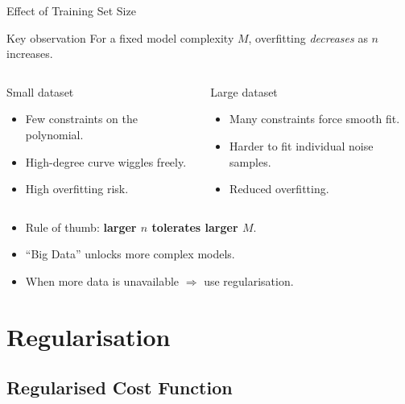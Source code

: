 \begin{frame}{Effect of Training Set Size}
  \begin{block}{Key observation}
    For a fixed model complexity $M$, overfitting \emph{decreases} as $n$ increases.
  \end{block}
  \begin{columns}[T]
  \begin{alertblock}{Small dataset}
    \begin{itemize}
      \item Few constraints on the polynomial.
      \item High-degree curve wiggles freely.
      \item \alert{High overfitting risk.}
    \end{itemize}
  \end{alertblock}
  \begin{exampleblock}{Large dataset}
    \begin{itemize}
      \item Many constraints force smooth fit.
      \item Harder to fit individual noise samples.
      \item \alert{Reduced overfitting.}
    \end{itemize}
  \end{exampleblock}
  \end{columns}
  \vspace{.4em}
  \begin{itemize}
    \item Rule of thumb: \textbf{larger $n$ tolerates larger $M$}.
    \item ``Big Data'' unlocks more complex models.
    \item When more data is unavailable $\Rightarrow$ use \alert{regularisation}.
  \end{itemize}
\end{frame}

\section{Regularisation}

\subsection{Regularised Cost Function}

